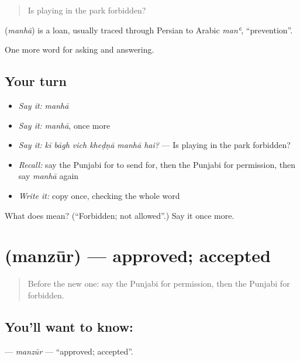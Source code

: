 \begin{quote}
Is playing in the park forbidden?
\end{quote}

\begin{cousinweb}
\textbf{} (\emph{manhā}) is a loan, usually traced through Persian to Arabic \emph{manʿ}, \textquotedblleft{}prevention\textquotedblright{}.
\end{cousinweb}

\begin{grammarlens}[title={What you've built}]
One more word for asking and answering.
\end{grammarlens}

\subsection*{Your turn}
\begin{itemize}
\raggedright
  \item \emph{Say it:} \emph{manhā}
  \item \emph{Say it:} \emph{manhā}, once more
  \item \emph{Say it:} \emph{kī bāgh vich kheḍṇā manhā hai?} — Is playing in the park forbidden?
  \item \emph{Recall:} say the Punjabi for to send for, then the Punjabi for permission, then say \emph{manhā} again
  \item \emph{Write it:} copy \textbf{} once, checking the whole word
\end{itemize}

\begin{tcolorbox}[breakable,colback=teal!4,colframe=teal!35!black,title={Before you move on}]
What does  mean? (\textquotedblleft{}Forbidden; not allowed\textquotedblright{}.) Say it once more.
\end{tcolorbox}
\section[\texorpdfstring{\pa{ਮਨਜ਼ੂਰ} (manzūr)}{ਮਨਜ਼ੂਰ (manzūr)}]{ (manzūr) — approved; accepted}

\label{lesson:PA-C338-manzur}



\begin{quote}
Before the new one: say the Punjabi for permission, then the Punjabi for forbidden.
\end{quote}

\subsection*{You'll want to know: }
\textbf{} — \emph{manzūr} — \textquotedblleft{}approved; accepted\textquotedblright{}.

